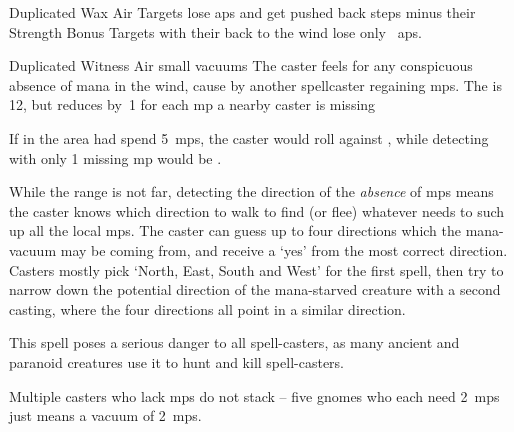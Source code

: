 \ifodd\value{diceNo}

  {Duplicated}%
  {Wax}%
  {Air}%
  {}%
  {Targets lose  \glspl{ap} and get pushed back  \glspl{step} minus their Strength Bonus}%
  {Targets with their back to the wind lose only
  \setcounter{track}{\value{spellPlusTwo}}%
  ~\glspl{ap}.}

\else

  {Duplicated}%
  {Witness}%
  {Air}%
  {small vacuums}%
  {The caster feels for any conspicuous absence of mana in the wind, cause by another spellcaster regaining \glspl{mp}.
  The  is 12, but reduces by~1 for each \gls{mp} a nearby caster is missing}%
  {If  in the \gls{area} had spend 5~\glspl{mp}, the caster would roll against \tn[7], while detecting  with only 1 missing \gls{mp} would be \tn[11].

  While the range is not far, detecting the direction of the \emph{absence} of \glspl{mp} means the caster knows which direction to walk to find (or flee) whatever needs to such up all the local \glspl{mp}.
  The caster can guess up to four directions which the mana-vacuum may be coming from, and receive a `yes' from the most correct direction.
  Casters mostly pick `North, East, South and West' for the first spell, then try to narrow down the potential direction of the mana-starved creature with a second casting, where the four directions all point in a similar direction.

  This spell poses a serious danger to all spell-casters, as many ancient and paranoid creatures use it to hunt and kill spell-casters.

  Multiple casters who lack \glspl{mp} do not stack -- five gnomes who each need 2~\glspl{mp} just means a vacuum of 2~\glspl{mp}.}

\fi
{}
